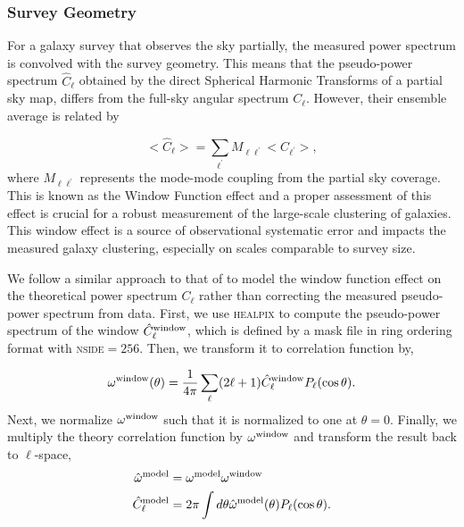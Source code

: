 \subsubsection{Survey Geometry}
For a galaxy survey that observes the sky partially, the measured power spectrum is convolved with the survey geometry. This means that the pseudo-power spectrum $\hat{C}_{\ell}$ obtained by the direct Spherical Harmonic Transforms of a partial sky map, differs from the full-sky angular spectrum $C_{\ell}$. However, their ensemble average is related by \citep{hivonmaster2002ApJ...567....2H} 

\begin{equation}
    <\hat{C}_{\ell}> = \sum_{\ell^{\prime}} M_{\ell \ell^{\prime}}<C_{\ell^{\prime}}>,
\end{equation}
where $M_{\ell \ell^{\prime}}$ represents the mode-mode coupling from the partial sky coverage. This is known as the Window Function effect and a proper assessment of this effect is crucial for a robust measurement of the large-scale clustering of galaxies. This window effect is a source of observational systematic error and impacts the measured galaxy clustering, especially on scales comparable to survey size.

We follow a similar approach to that of \citep{chon2004MNRAS.350..914C} to model the window function effect on the theoretical power spectrum $C_{\ell}$ rather than correcting the measured pseudo-power spectrum from data. First, we use \textsc{healpix} to compute the pseudo-power spectrum of the window $\hat{C}^{\rm window}_{\ell}$, which is defined by a mask file in ring ordering format with \textsc{nside}$=256$. Then, we transform it to correlation function by,

\begin{equation}
    \omega^{\rm window} (\theta) = \frac{1}{4\pi}\sum_{\ell} (2\ell+1) \hat{C}^{\rm window}_{\ell} P_{\ell}(\cos \theta).
\end{equation}
Next, we normalize $\omega^{\rm window}$ such that it is normalized to one at $\theta=0$. Finally, we multiply the theory correlation function by $\omega^{\rm window}$ and transform the result back to $\ell$-space,%
\begin{align}
    \hat{\omega}^{\rm model} &= \omega^{\rm model} \omega^{\rm window} \\
    \hat{C}^{\rm model}_{\ell} &= 2\pi \int d\theta \hat{\omega}^{\rm model}(\theta)P_{\ell}(\cos \theta).
\end{align}


